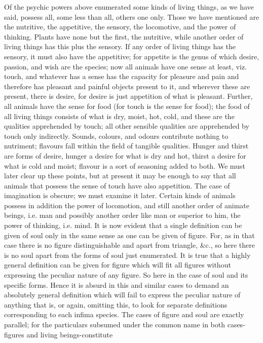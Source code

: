Of the psychic powers above enumerated some kinds of living things,
as we have said, possess all, some less than all, others one only.
Those we have mentioned are the nutritive, the appetitive, the sensory,
the locomotive, and the power of thinking. Plants have none but the
first, the nutritive, while another order of living things has this
plus the sensory. If any order of living things has the sensory, it
must also have the appetitive; for appetite is the genus of which
desire, passion, and wish are the species; now all animals have one
sense at least, viz. touch, and whatever has a sense has the capacity
for pleasure and pain and therefore has pleasant and painful objects
present to it, and wherever these are present, there is desire, for
desire is just appetition of what is pleasant. Further, all animals
have the sense for food (for touch is the sense for food); the food
of all living things consists of what is dry, moist, hot, cold, and
these are the qualities apprehended by touch; all other sensible qualities
are apprehended by touch only indirectly. Sounds, colours, and odours
contribute nothing to nutriment; flavours fall within the field of
tangible qualities. Hunger and thirst are forms of desire, hunger
a desire for what is dry and hot, thirst a desire for what is cold
and moist; flavour is a sort of seasoning added to both. We must later
clear up these points, but at present it may be enough to say that
all animals that possess the sense of touch have also appetition.
The case of imagination is obscure; we must examine it later. Certain
kinds of animals possess in addition the power of locomotion, and
still another order of animate beings, i.e. man and possibly another
order like man or superior to him, the power of thinking, i.e. mind.
It is now evident that a single definition can be given of soul only
in the same sense as one can be given of figure. For, as in that case
there is no figure distinguishable and apart from triangle, &c., so
here there is no soul apart from the forms of soul just enumerated.
It is true that a highly general definition can be given for figure
which will fit all figures without expressing the peculiar nature
of any figure. So here in the case of soul and its specific forms.
Hence it is absurd in this and similar cases to demand an absolutely
general definition which will fail to express the peculiar nature
of anything that is, or again, omitting this, to look for separate
definitions corresponding to each infima species. The cases of figure
and soul are exactly parallel; for the particulars subsumed under
the common name in both cases-figures and living beings-constitute
